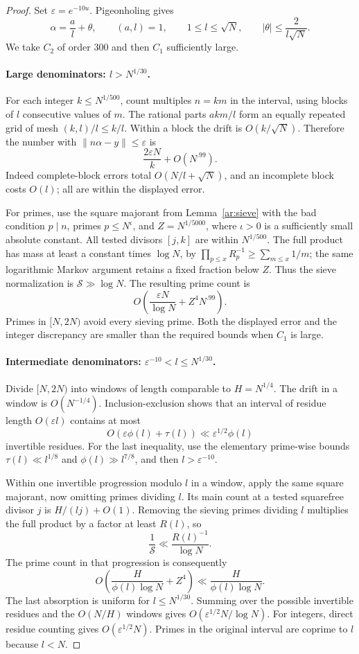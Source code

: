 \begin{proof}
Set $\varepsilon=e^{-10u}$. Pigeonholing gives
\[
 \alpha=\frac al+\theta,\qquad
 (a,l)=1,\qquad 1\le l\le\sqrt N,\qquad
 |\theta|\le\frac2{l\sqrt N}.
\]
We take $C_2$ of order $300$ and then $C_1$ sufficiently large.

\paragraph{Large denominators: $l>N^{1/30}$.}
For each integer $k\le N^{1/500}$, count multiples $n=km$ in the
interval, using blocks of $l$ consecutive values of $m$. The rational
parts $akm/l$ form an equally repeated grid of mesh $(k,l)/l\le k/l$.
Within a block the drift is $O(k/\sqrt N)$. Therefore the number with
$\|n\alpha-y\|\le\varepsilon$ is
\[
 \frac{2\varepsilon N}{k}+O(N^{.99}).
\]
Indeed complete-block errors total $O(N/l+\sqrt N)$, and an incomplete
block costs $O(l)$; all are within the displayed error.

For primes, use the square majorant from Lemma~\ref{ar:sieve} with the
bad condition $p\mid n$, primes $p\le N^\iota$, and
$Z=N^{1/5000}$, where $\iota>0$ is a sufficiently small absolute
constant. All tested divisors $[j,k]$ are within $N^{1/500}$. The full
product has mass at least a constant times $\log N$, by
$\prod_{p\le x}R_p^{-1}\ge\sum_{m\le x}1/m$; the same logarithmic
Markov argument retains a fixed fraction below $Z$. Thus the sieve
normalization is $\mathcal S\gg\log N$. The resulting prime count is
\[
 O\left(\frac{\varepsilon N}{\log N}
       +Z^4N^{.99}\right).
\]
Primes in $[N,2N)$ avoid every sieving prime. Both the displayed error
and the integer discrepancy are smaller than the required bounds when
$C_1$ is large.

\paragraph{Intermediate denominators:
$\varepsilon^{-10}<l\le N^{1/30}$.}
Divide $[N,2N)$ into windows of length comparable to $H=N^{1/4}$.
The drift in a window is $O(N^{-1/4})$. Inclusion-exclusion shows that
an interval of residue length $O(\varepsilon l)$ contains at most
\[
 O(\varepsilon\phi(l)+\tau(l))
 \ll\varepsilon^{1/2}\phi(l)
\]
invertible residues. For the last inequality, use the elementary
prime-wise bounds $\tau(l)\ll l^{1/8}$ and
$\phi(l)\gg l^{7/8}$, and then $l>\varepsilon^{-10}$.

Within one invertible progression modulo $l$ in a window, apply the
same square majorant, now omitting primes dividing $l$. Its main count
at a tested squarefree divisor $j$ is $H/(lj)+O(1)$. Removing the sieving
primes dividing $l$ multiplies the full product by a factor at least
$R(l)$, so
\[
 \frac1{\mathcal S}\ll\frac{R(l)^{-1}}{\log N}.
\]
The prime count in that progression is consequently
\[
 O\left(\frac{H}{\phi(l)\log N}+Z^4\right)
 \ll\frac{H}{\phi(l)\log N}.
\]
The last absorption is uniform for $l\le N^{1/30}$. Summing over
the possible invertible residues and the $O(N/H)$ windows gives
$O(\varepsilon^{1/2}N/\log N)$. For integers, direct residue counting
gives $O(\varepsilon^{1/2}N)$. Primes in the original interval are
coprime to $l$ because $l<N$.


\end{proof}
